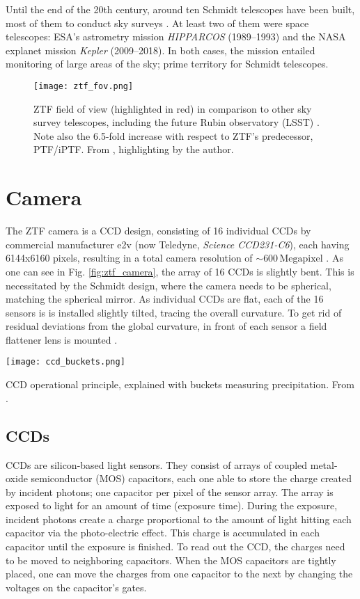 Until the end of the 20th century, around ten Schmidt telescopes have been built, most of them to conduct sky surveys . At least two of them were space telescopes: ESA's astrometry mission \textit{HIPPARCOS}  (1989--1993) and the NASA explanet mission \textit{Kepler}  (2009--2018). In both cases, the mission entailed monitoring of large areas of the sky; prime territory for Schmidt telescopes.

\begin{figure}[]
    \texttt{[image: ztf\_fov.png]}
    \caption[ZTF Field of View]{ZTF field of view (highlighted in red) in comparison to other sky survey telescopes, including the future Rubin observatory (LSST) \cite{Ivezic2019}. Note also the 6.5-fold increase with respect to ZTF's predecessor, PTF/iPTF. From \cite{Laher2018}, highlighting by the author.}
\end{figure}



\section{Camera}
The ZTF camera is a CCD design, consisting of 16 individual CCDs by commercial manufacturer e2v (now Teledyne, \textit{Science CCD231-C6}), each having 6144x6160 pixels, resulting in a total camera resolution of $\sim 600 \,\textrm{Megapixel}$ . As one can see in Fig. \ref{fig:ztf_camera}, the array of 16 CCDs is slightly bent. This is necessitated by the Schmidt design, where the camera needs to be spherical, matching the spherical mirror. As individual CCDs are flat, each of the 16 sensors is is installed slightly tilted, tracing the overall curvature. To get rid of residual deviations from the global curvature, in front of each sensor a field flattener lens is mounted .

\begin{marginfigure}
    \texttt{[image: ccd\_buckets.png]}
    \caption[CCD operational principle]{CCD operational principle, explained with buckets measuring precipitation. From \cite{Janesick1987}.}
\end{marginfigure}

\subsection{CCDs}
CCDs are silicon-based light sensors. They consist of arrays of coupled metal-oxide semiconductor (MOS) capacitors, each one able to store the charge created by incident photons; one capacitor per pixel of the sensor array. The array is exposed to light for an amount of time (exposure time). During the exposure, incident photons create a charge proportional to the amount of light hitting each capacitor via the photo-electric effect. This charge is accumulated in each capacitor until the exposure is finished. To read out the CCD, the charges need to be moved to neighboring capacitors. When the MOS capacitors are tightly placed, one can move the charges from one capacitor to the next by changing the voltages on the capacitor's gates.


